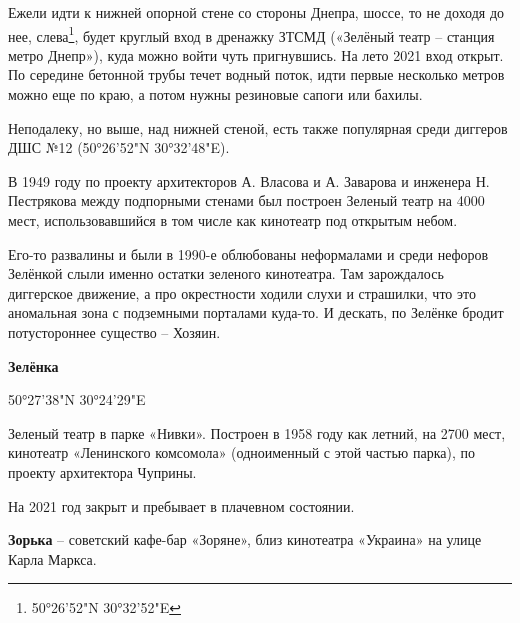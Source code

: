 Ежели идти к нижней опорной стене со стороны Днепра, шоссе, то не доходя до нее, слева\footnote{50°26'52"N 30°32'52"E}, будет круглый вход в дренажку ЗТСМД («Зелёный театр – станция метро Днепр»), куда можно войти чуть пригнувшись. На лето 2021 вход открыт. По середине бетонной трубы течет водный поток, идти первые несколько метров можно еще по краю, а потом нужны резиновые сапоги или бахилы.

Неподалеку, но выше, над нижней стеной, есть также популярная среди диггеров ДШС №12 (50°26'52"N 30°32'48"E).

В 1949 году по проекту архитекторов А. Власова и А. Заварова и инженера Н. Пестрякова между подпорными стенами был построен Зеленый театр на 4000 мест, использовавшийся в том числе как кинотеатр под открытым небом.

Его-то развалины и были в 1990-е облюбованы неформалами и среди нефоров Зелёнкой слыли именно остатки зеленого кинотеатра. Там зарождалось диггерское движение, а про окрестности ходили слухи и страшилки, что это аномальная зона с подземными порталами куда-то. И дескать, по Зелёнке бродит потустороннее существо – Хозяин.\\


\medskip

\textbf{Зелёнка}

50°27'38"N 30°24'29"E

Зеленый театр в парке «Нивки». Построен в 1958 году как летний, на 2700 мест, кинотеатр «Ленинского комсомола» (одноименный с этой частью парка), по проекту архитектора Чуприны.

На 2021 год закрыт и пребывает в плачевном состоянии.\\

\medskip

\textbf{Зорька} – советский кафе-бар «Зоряне», близ кинотеатра «Украина» на улице Карла Маркса.\\